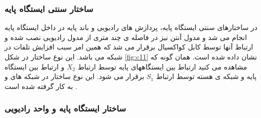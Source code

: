 \subsubsection{ساختار سنتی ایستگاه پایه }

در ساختارهای سنتی ایستگاه پایه، پردازش های رادیویی و باند پایه در
داخل ایستگاه پایه انجام می شد و مدول آنتن نیز در فاصله
ی چند متری از مدول رادیویی نصب شده و ارتباط آنها
توسط کابل کواکسیال برقرار می شد که همین امر سبب
افزایش تلفات در شبکه می باشد. این نوع ساختار در شکل
\ref{fig:c11} نشان داده شده است. همان گونه که مشاهده می کنید
ارتباط بین ایستگاههای پایه توسط ارتباط  $X_2$ و ارتباط بین
ایستگاه پایه و شبکه ی هسته توسط ارتباط $ S_1$ برقرار می
شود. این نوع ساختار در شبکه های  و  به کار گرفته
شده است 
\cite{checko2015cloud}.

\subsubsection{ ساختار ایستگاه پایه و واحد رادیویی}

